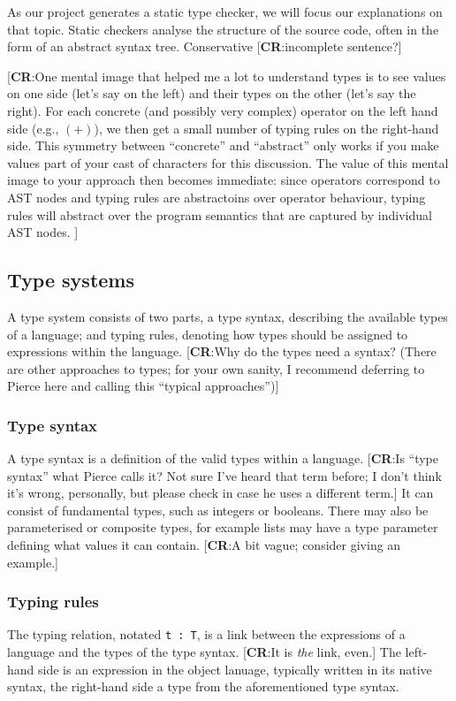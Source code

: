 \documentclass[nofilelist]{cslthse-msc}
\newcommand{\CR}[1]{\textcolor{green!60!black}{[\textbf{CR}:#1]}}
\begin{document}
As our project generates a static type checker, we will focus our explanations on that topic.
Static checkers analyse the structure of the source code, often in the form of an abstract syntax tree.
Conservative \CR{incomplete sentence?}

\CR{One mental image that helped me a lot to understand types is to see values  on one side (let's say on the left) and their types on the other (let's say the right).
  For each concrete (and possibly very complex) operator on the left hand side (e.g., $(+)$), we then get a small number of typing rules on the right-hand side.
  This symmetry between ``concrete'' and ``abstract'' only works if you make values part of your cast of characters for this discussion.
  The value of this mental image to your approach then becomes immediate: since operators correspond to AST nodes and typing rules are abstractoins
  over operator behaviour, typing rules will abstract over the program semantics that are captured by individual AST nodes.
}

\subsection{Type systems}
A type system consists of two parts, a type syntax, describing the available types of a language; and typing rules, denoting how types should be assigned to expressions within the language.
\CR{Why do the types need a syntax?
    (There are other approaches to types; for your own sanity, I recommend deferring to Pierce here and calling this ``typical approaches'')}

\subsubsection{Type syntax}
A type syntax is a definition of the valid types within a language.
\CR{Is ``type syntax'' what Pierce calls it?  Not sure I've heard that term before; I don't think it's wrong, personally, but please check in case he uses a different term.}
It can consist of fundamental types, such as integers or booleans.
There may also be parameterised or composite types, for example lists may have a type parameter defining what values it can contain.
\CR{A bit vague; consider giving an example.}

\subsubsection{Typing rules}
The typing relation, notated \lstinline{t : T}, is a link between the expressions of a language and the types of the type syntax.
\CR{It is \emph{the} link, even.}
The left-hand side is an expression in the object lanuage, typically written in its native syntax, the right-hand side a type from the aforementioned type syntax.
\end{document}
